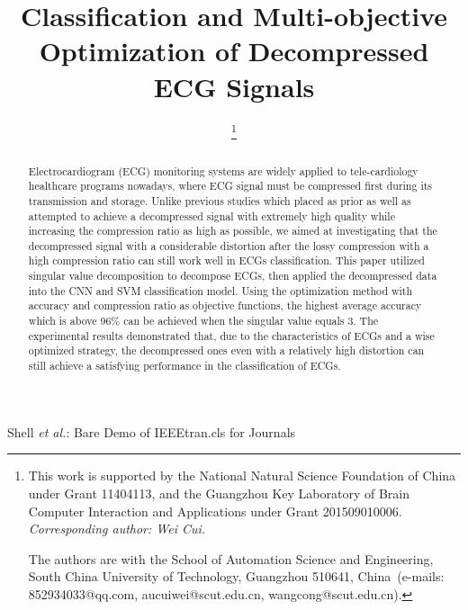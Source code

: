 \documentclass[journal]{IEEEtran}
\begin{document}
\title{ Classification and Multi-objective Optimization of Decompressed ECG Signals  }

\author{

\thanks{%
This work is supported by the National Natural Science Foundation of China under Grant 11404113, and the Guangzhou Key Laboratory of Brain Computer Interaction and Applications under Grant 201509010006. \textit{Corresponding
author: Wei Cui.}

The authors are with the School of Automation Science and Engineering, South China University of Technology, Guangzhou 510641, China~(e-mails: 852934033@qq.com, aucuiwei@scut.edu.cn, wangcong@scut.edu.cn).
}}

{Shell \MakeLowercase{\textit{et al.}}: Bare Demo of IEEEtran.cls for Journals}
\maketitle
\IEEEpeerreviewmaketitle

\begin{abstract}
 Electrocardiogram (ECG) monitoring systems are widely applied to tele-cardiology healthcare programs nowadays, where ECG signal must be compressed first during its transmission and storage. Unlike previous studies which placed as prior as well as attempted to achieve a decompressed signal with extremely high quality while increasing the compression ratio as high as possible, we aimed at investigating that the decompressed signal with a considerable distortion after the lossy compression with a high compression ratio can still work well in ECGs classification. This paper utilized singular value decomposition to decompose ECGs, then applied the decompressed data into the CNN and SVM classification model. Using the optimization method with accuracy and compression ratio as objective functions, the highest average accuracy which is above 96\% can be achieved when the singular value equals 3. The experimental results demonstrated that, due to the characteristics of ECGs and a wise optimized strategy, the decompressed ones even with a relatively high distortion can still achieve a satisfying performance in the classification of ECGs.
\end{abstract}
\end{document}
